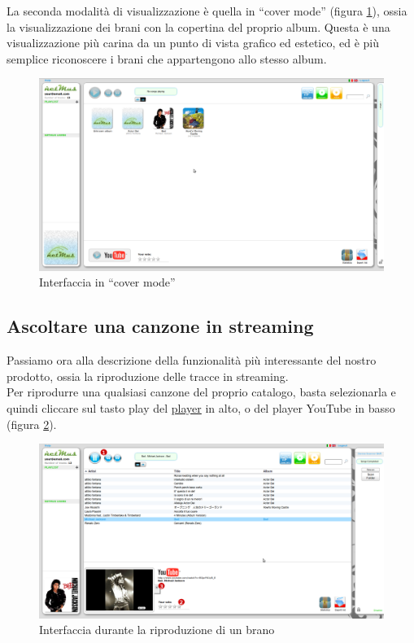 La seconda modalit\`a di visualizzazione \`e quella in ``cover mode'' (figura
\ref{fig:coverMode}), ossia la visualizzazione dei brani con la copertina del
proprio album. Questa \`e una visualizzazione pi\`u carina da un punto di vista grafico ed estetico, ed \`e
pi\`u semplice riconoscere i brani che appartengono allo stesso album.\\

\begin{figure}[!htbp]
  \centering
  \includegraphics[width=14cm]{img/MU/cover_mode.png}
\caption{Interfaccia in ``cover mode''}
\label{fig:coverMode}
\end{figure}

\newpage
\subsection{Ascoltare una canzone in streaming}

Passiamo ora alla descrizione della funzionalit\`a pi\`u
interessante del nostro prodotto, ossia la riproduzione delle tracce in streaming.\\
Per riprodurre una qualsiasi canzone del proprio catalogo, basta selezionarla e
quindi cliccare sul tasto play del \underline{player} in alto, o del player
YouTube in basso (figura \ref{fig:play}).\\ 
\begin{figure}[!htbp]
  \centering
  \includegraphics[width=14cm]{img/MU/player_youtube.png}
\caption{Interfaccia durante la riproduzione di un brano}
\label{fig:play}
\end{figure} 

